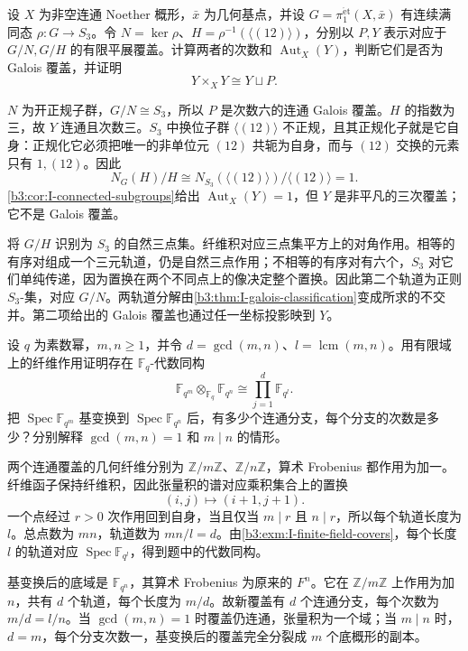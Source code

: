 \begin{exercise}\label{b3:ex:I-symmetric-three-cover}
	设 \(X\) 为非空连通 Noether 概形，\(\bar x\) 为几何基点，并设 \(G=\pi_1^{\mathrm{\acute et}}(X,\bar x)\) 有连续满同态 \(\rho:G\rightarrow S_3\)。令 \(N=\ker\rho\)、\(H=\rho^{-1}(\langle(12)\rangle)\)，分别以 \(P,Y\) 表示对应于 \(G/N,G/H\) 的有限平展覆盖。计算两者的次数和 \(\operatorname{Aut}_X(Y)\)，判断它们是否为 Galois 覆盖，并证明
	\[
		Y\times_XY\cong Y\sqcup P.
	\]
\end{exercise}
\begin{solution}
	\(N\) 为开正规子群，\(G/N\cong S_3\)，所以 \(P\) 是次数六的连通 Galois 覆盖。\(H\) 的指数为三，故 \(Y\) 连通且次数三。\(S_3\) 中换位子群 \(\langle(12)\rangle\) 不正规，且其正规化子就是它自身：正规化它必须把唯一的非单位元 \((12)\) 共轭为自身，而与 \((12)\) 交换的元素只有 \(1,(12)\)。因此
	\[
		N_G(H)/H\cong
		N_{S_3}(\langle(12)\rangle)/\langle(12)\rangle=1.
	\]
	\cref{b3:cor:I-connected-subgroups}给出 \(\operatorname{Aut}_X(Y)=1\)，但 \(Y\) 是非平凡的三次覆盖；它不是 Galois 覆盖。

	将 \(G/H\) 识别为 \(S_3\) 的自然三点集。纤维积对应三点集平方上的对角作用。相等的有序对组成一个三元轨道，仍是自然三点作用；不相等的有序对有六个，\(S_3\) 对它们单纯传递，因为置换在两个不同点上的像决定整个置换。因此第二个轨道为正则 \(S_3\)-集，对应 \(G/N\)。两轨道分解由\cref{b3:thm:I-galois-classification}变成所求的不交并。第二项给出的 Galois 覆盖也通过任一坐标投影映到 \(Y\)。
\end{solution}

\begin{exercise}\label{b3:ex:I-finite-field-tensor-cover}
	设 \(q\) 为素数幂，\(m,n\ge1\)，并令 \(d=\gcd(m,n)\)、\(l=\operatorname{lcm}(m,n)\)。用有限域上的纤维作用证明存在 \(\mathbb F_q\)-代数同构
	\[
		\mathbb F_{q^m}\otimes_{\mathbb F_q}\mathbb F_{q^n}
		\cong\prod_{j=1}^{d}\mathbb F_{q^l}.
	\]
	把 \(\operatorname{Spec}\mathbb F_{q^m}\) 基变换到 \(\operatorname{Spec}\mathbb F_{q^n}\) 后，有多少个连通分支，每个分支的次数是多少？分别解释 \(\gcd(m,n)=1\) 和 \(m\mid n\) 的情形。
\end{exercise}
\begin{solution}
	两个连通覆盖的几何纤维分别为 \(\mathbb Z/m\mathbb Z\)、\(\mathbb Z/n\mathbb Z\)，算术 Frobenius 都作用为加一。纤维函子保持纤维积，因此张量积的谱对应乘积集合上的置换
	\[
		(i,j)\longmapsto(i+1,j+1).
	\]
	一个点经过 \(r>0\) 次作用回到自身，当且仅当 \(m\mid r\) 且 \(n\mid r\)，所以每个轨道长度为 \(l\)。总点数为 \(mn\)，轨道数为 \(mn/l=d\)。由\cref{b3:exm:I-finite-field-covers}，每个长度 \(l\) 的轨道对应 \(\operatorname{Spec}\mathbb F_{q^l}\)，得到题中的代数同构。

	基变换后的底域是 \(\mathbb F_{q^n}\)，其算术 Frobenius 为原来的 \(F^n\)。它在 \(\mathbb Z/m\mathbb Z\) 上作用为加 \(n\)，共有 \(d\) 个轨道，每个长度为 \(m/d\)。故新覆盖有 \(d\) 个连通分支，每个次数为 \(m/d=l/n\)。当 \(\gcd(m,n)=1\) 时覆盖仍连通，张量积为一个域；当 \(m\mid n\) 时，\(d=m\)，每个分支次数一，基变换后的覆盖完全分裂成 \(m\) 个底概形的副本。
\end{solution}

